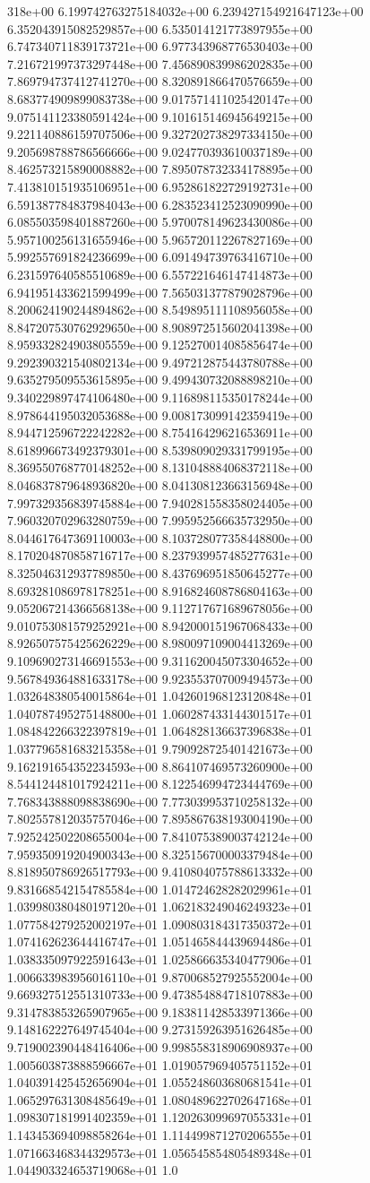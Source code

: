 318e+00	6.199742763275184032e+00	6.239427154921647123e+00	6.352043915082529857e+00	6.535014121773897955e+00	6.747340711839173721e+00	6.977343968776530403e+00	7.216721997373297448e+00	7.456890839986202835e+00	7.869794737412741270e+00	8.320891866470576659e+00	8.683774909899083738e+00	9.017571411025420147e+00	9.075141123380591424e+00	9.101615146945649215e+00	9.221140886159707506e+00	9.327202738297334150e+00	9.205698788786566666e+00	9.024770393610037189e+00	8.462573215890008882e+00	7.895078732334178895e+00	7.413810151935106951e+00	6.952861822729192731e+00	6.591387784837984043e+00	6.283523412523090990e+00	6.085503598401887260e+00	5.970078149623430086e+00	5.957100256131655946e+00	5.965720112267827169e+00	5.992557691824236699e+00	6.091494739763416710e+00	6.231597640585510689e+00	6.557221646147414873e+00	6.941951433621599499e+00	7.565031377879028796e+00	8.200624190244894862e+00	8.549895111108956058e+00	8.847207530762929650e+00	8.908972515602041398e+00	8.959332824903805559e+00	9.125270014085856474e+00	9.292390321540802134e+00	9.497212875443780788e+00	9.635279509553615895e+00	9.499430732088898210e+00	9.340229897474106480e+00	9.116898115350178244e+00	8.978644195032053688e+00	9.008173099142359419e+00	8.944712596722242282e+00	8.754164296216536911e+00	8.618996673492379301e+00	8.539809029331799195e+00	8.369550768770148252e+00	8.131048884068372118e+00	8.046837879648936820e+00	8.041308123663156948e+00	7.997329356839745884e+00	7.940281558358024405e+00	7.960320702963280759e+00	7.995952566635732950e+00	8.044617647369110003e+00	8.103728077358448800e+00	8.170204870858716717e+00	8.237939957485277631e+00	8.325046312937789850e+00	8.437696951850645277e+00	8.693281086978178251e+00	8.916824608786804163e+00	9.052067214366568138e+00	9.112717671689678056e+00	9.010753081579252921e+00	8.942000151967068433e+00	8.926507575425626229e+00	8.980097109004413269e+00	9.109690273146691553e+00	9.311620045073304652e+00	9.567849364881633178e+00	9.923553707009494573e+00	1.032648380540015864e+01	1.042601968123120848e+01	1.040787495275148800e+01	1.060287433144301517e+01	1.084842266322397819e+01	1.064828136637396838e+01	1.037796581683215358e+01	9.790928725401421673e+00	9.162191654352234593e+00	8.864107469573260900e+00	8.544124481017924211e+00	8.122546994723444769e+00	7.768343888098838690e+00	7.773039953710258132e+00	7.802557812035757046e+00	7.895867638193004190e+00	7.925242502208655004e+00	7.841075389003742124e+00	7.959350919204900343e+00	8.325156700003379484e+00	8.818950786926517793e+00	9.410804075788613332e+00	9.831668542154785584e+00	1.014724628282029961e+01	1.039980380480197120e+01	1.062183249046249323e+01	1.077584279252002197e+01	1.090803184317350372e+01	1.074162623644416747e+01	1.051465844439694486e+01	1.038335097922591643e+01	1.025866635340477906e+01	1.006633983956016110e+01	9.870068527925552004e+00	9.669327512551310733e+00	9.473854884718107883e+00	9.314783853265907965e+00	9.183811428533971366e+00	9.148162227649745404e+00	9.273159263951626485e+00	9.719002390448416406e+00	9.998558318906908937e+00	1.005603873888596667e+01	1.019057969405751152e+01	1.040391425452656904e+01	1.055248603680681541e+01	1.065297631308485649e+01	1.080489622702647168e+01	1.098307181991402359e+01	1.120263099697055331e+01	1.143453694098858264e+01	1.114499871270206555e+01	1.071663468344329573e+01	1.056545854805489348e+01	1.044903324653719068e+01	1.0